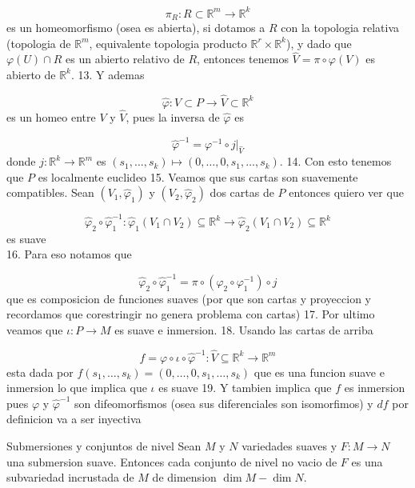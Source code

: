 \begin{bookproof}{}
\[
\pi_R:R\subset\mathbb R^m\to\mathbb R^k
\]
es un homeomorfismo (osea es abierta), si dotamos a $R$ con la topologia relativa (topologia de $\mathbb R^m$, equivalente topologia producto $\mathbb R^r\times\mathbb R^k$), y dado que $\varphi(U)\cap R$ es un abierto relativo de $R$, entonces tenemos $\widehat V=\pi\circ\varphi(V)$ es abierto de $\mathbb R^k$. 13. Y ademas

\[
\widehat\varphi:V\subset P\to\widehat V\subset\mathbb R^k
\]
es un homeo entre $V$ y $\widehat V$, pues la inversa de $\widehat\varphi$ es

\[
\widehat\varphi^{-1}=\varphi^{-1}\circ j|_{\widehat V}
\]
donde $j:\mathbb R^k\to\mathbb R^m$ es $(s_1,\ldots,s_k)\mapsto(0,\ldots,0,s_1,\ldots,s_k)$. 14. Con esto tenemos que $P$ es localmente euclideo 15. Veamos que sus cartas son suavemente compatibles. Sean $(V_{1},\hat{\varphi}_{1})$ y $(V_{2},\hat{\varphi}_{2})$ dos cartas de $P$ entonces quiero ver que

\[
\widehat{\varphi}_{2}\circ \hat{\varphi}_{1}^{-1}:\widehat{\varphi}_{1}(V_{1}\cap V_{2})\subseteq \mathbb{R}^{k}\rightarrow \widehat{\varphi}_{2}(V_{1}\cap V_{2})\subseteq \mathbb{R}^{k}
\]
es suave\\
16. Para eso notamos que

\[
\hat{\varphi}_{2}\circ \hat{\varphi}_{1}^{-1}=\pi\circ(\varphi_{2}\circ\varphi_{1}^{-1})\circ j
\]
que es composicion de funciones suaves (por que son cartas y proyeccion y recordamos que corestringir no genera problema con cartas) 17. Por ultimo veamos que $\iota:P\rightarrow M$ es suave e inmersion. 18. Usando las cartas de arriba

\[
f=\varphi\circ\iota\circ\hat{\varphi}^{-1}:\widehat{V}\subseteq \mathbb{R}^{k}\rightarrow\mathbb{R}^{m}
\]
esta dada por $f(s_{1},\ldots,s_{k})=(0,\ldots,0,s_{1},\ldots,s_{k})$ que es una funcion suave e inmersion lo que implica que $\iota$ es suave 19. Y tambien implica que $f$ es inmersion pues $\varphi$ y $\hat{\varphi}^{-1}$ son difeomorfismos (osea sus diferenciales son isomorfimos) y $df$ por definicion va a ser inyectiva

\bookqed
\end{bookproof}
\label{blk:210dde}
\begin{bookcorollary}{Submersiones y conjuntos de nivel}
Sean $M$ y $N$ variedades suaves y $F:M\to N$ una submersion suave. Entonces cada conjunto de nivel no vacio de $F$ es una subvariedad incrustada de $M$ de dimension $\dim M-\dim N$.

\end{bookcorollary}
\label{blk:784cb7}

